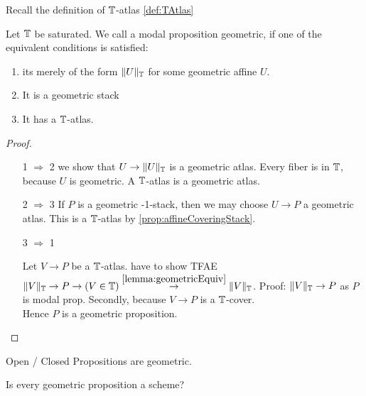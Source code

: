Recall the definition of $\mathbb{T}$-atlas \ref{def:TAtlas}
\begin{definition}{\label{def:algprop}}
	Let $\mathbb{T}$ be saturated. We call a modal proposition geometric, if one of the equivalent conditions is satisfied:
	\begin{enumerate}
		\item  its merely of the form $\|U\|_{\mathbb{T}}$ for some geometric affine $U$.
		\item It is a geometric stack
		\item It has a $\mathbb{T}$-atlas.

	\end{enumerate}
	
\end{definition}
\begin{proof} \
	\begin{enumerate}
		\item [1 $\Rightarrow$ 2]
		we show that $U \to \|U\|_{\mathbb{T}}$ is a geometric atlas. Every fiber is in $\mathbb{T}$, because $U$ is geometric. A $\mathbb{T}$-atlas is a geometric atlas.
		\item [2 $\Rightarrow$ 3]
		If $P$ is a geometric -1-stack, then we may choose $U \to P$ a geometric atlas. This is a $\mathbb{T}$-atlas by \ref{prop:affineCoveringStack}.

		\item [3 $\Rightarrow$ 1]
		
		Let $V \to P$ be a $\mathbb{T}$-atlas.
		have to show TFAE $\|V\|_{\mathbb{T}} \to P \to (V \in \mathbb{T}) \overset{\ref{lemma:geometricEquiv}}{\to} \|V\|_{\mathbb{T}}$. 
		Proof: $\|V\|_{\mathbb{T}} \to P$ as $P$ is modal prop. Secondly, because $V \to P$ is a $\mathbb{T}$-cover. \\
		Hence $P$ is a geometric proposition.
	\end{enumerate}
	
\end{proof}
\begin{example}
	Open / Closed Propositions are geometric.
\end{example}
\begin{question}
Is every geometric proposition a scheme?
\end{question}

